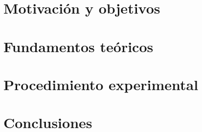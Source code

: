 \documentclass[spanish,a4paper,11pt,twoside]{report}
\begin{document}

\tableofcontents

\newpage{\pagestyle{empty}\cleardoublepage}

\listoffigures

\newpage{\pagestyle{empty}\cleardoublepage}

\listoftables

\newpage{\pagestyle{empty}\cleardoublepage}

\renewcommand{\thepage}{\arabic{page}}
\setcounter{page}{1}

\setlength{\parindent}{5mm}

\chapter{Motivación y objetivos}
\label{chapter:obj}


\chapter{Fundamentos teóricos}
\label{chapter:teo}


\chapter{Procedimiento experimental}
\label{chapter:exp}



\chapter{Conclusiones}
\label{chapter:conclusiones}



\end{document}
